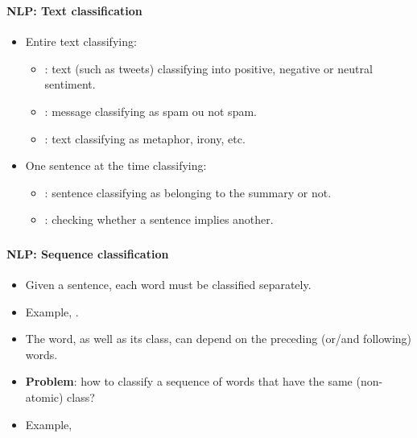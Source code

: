 \documentclass[xcolor=table]{beamer}
\begin{document}
\begin{frame}
	\frametitle{\inserttitle}
	\framesubtitle{NLP: Text classification}
	
	\begin{itemize}
		\item Entire text classifying:
		\begin{itemize}
			\item {}: text (such as tweets) classifying into positive, negative or neutral sentiment.
			\item {}: message classifying as spam ou not spam.
			\item {}: text classifying as metaphor, irony, etc.
		\end{itemize}
		\item One sentence at the time classifying:
		\begin{itemize}
			\item {}: sentence classifying as belonging to the summary or not.
			\item {}: checking whether a sentence implies another.
		\end{itemize}
	\end{itemize}
	
\end{frame}


\begin{frame}
	\frametitle{\inserttitle}
	\framesubtitle{NLP: Sequence classification}
	
	\begin{itemize}
		\item Given a sentence, each word must be classified separately.
		\item Example, .
		\item The word, as well as its class, can depend on the preceding (or/and following) words.
		\item \textbf{Problem}: how to classify a sequence of words that have the same (non-atomic) class?
		\item Example, 
	\end{itemize}
	
\end{frame}
\end{document}
